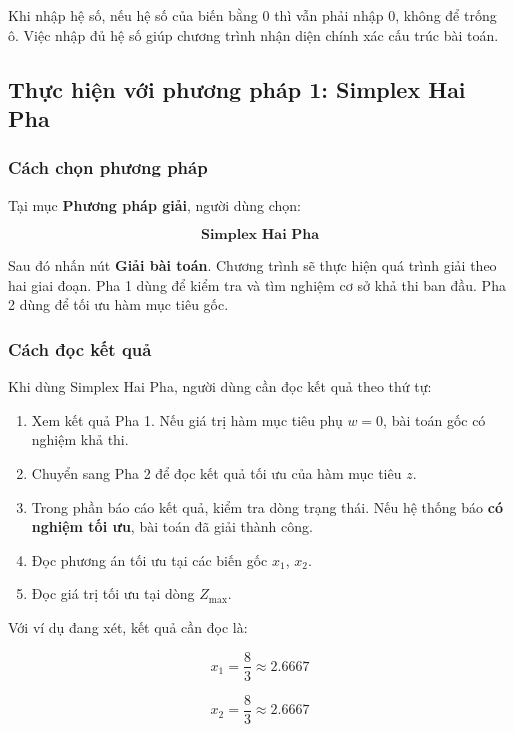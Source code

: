 \documentclass[14pt, a4paper]{extarticle}
\renewcommand{\frac}{\dfrac}
\begin{document}
    Khi nhập hệ số, nếu hệ số của biến bằng 0 thì vẫn phải nhập 0, không để trống ô. Việc nhập đủ hệ số giúp chương trình nhận diện chính xác cấu trúc bài toán.
    
    
    \subsection{Thực hiện với phương pháp 1: Simplex Hai Pha}
    
    \subsubsection{Cách chọn phương pháp}
    
    Tại mục \textbf{Phương pháp giải}, người dùng chọn:
    
    \[
    \textbf{Simplex Hai Pha}
    \]
    
    Sau đó nhấn nút \textbf{Giải bài toán}. Chương trình sẽ thực hiện quá trình giải theo hai giai đoạn. Pha 1 dùng để kiểm tra và tìm nghiệm cơ sở khả thi ban đầu. Pha 2 dùng để tối ưu hàm mục tiêu gốc.
    
    \subsubsection{Cách đọc kết quả}
    
    Khi dùng Simplex Hai Pha, người dùng cần đọc kết quả theo thứ tự:
    
    \begin{enumerate}
        \item Xem kết quả Pha 1. Nếu giá trị hàm mục tiêu phụ $w = 0$, bài toán gốc có nghiệm khả thi.
        \item Chuyển sang Pha 2 để đọc kết quả tối ưu của hàm mục tiêu $z$.
        \item Trong phần báo cáo kết quả, kiểm tra dòng trạng thái. Nếu hệ thống báo \textbf{có nghiệm tối ưu}, bài toán đã giải thành công.
        \item Đọc phương án tối ưu tại các biến gốc $x_1$, $x_2$.
        \item Đọc giá trị tối ưu tại dòng $Z_{\max}$.
    \end{enumerate}
    
    Với ví dụ đang xét, kết quả cần đọc là:
    
    \[
    x_1 = \frac{8}{3} \approx 2.6667
    \]
    
    \[
    x_2 = \frac{8}{3} \approx 2.6667
    \]
    
\end{document}
